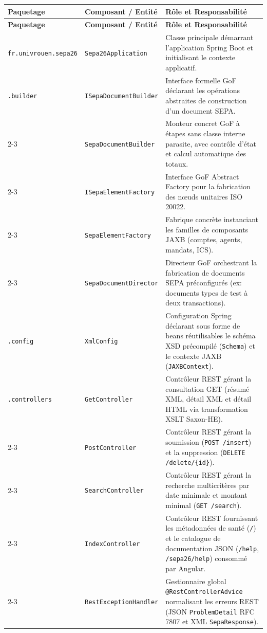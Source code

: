 \documentclass[12pt,a4paper]{article}
\begin{document}
\small
\begin{longtable}{|p{3.8cm}|p{4.6cm}|p{6.8cm}|}
    \hline
    \textbf{Paquetage} & \textbf{Composant / Entité} & \textbf{Rôle et Responsabilité} \\
    \hline
    \endfirsthead
    \hline
    \textbf{Paquetage} & \textbf{Composant / Entité} & \textbf{Rôle et Responsabilité} \\
    \hline
    \endhead

    \texttt{fr.univrouen.sepa26} & \texttt{Sepa26Application} & Classe principale démarrant l'application Spring Boot et initialisant le contexte applicatif. \\
    \hline

    \texttt{.builder} & \texttt{ISepaDocumentBuilder} & Interface formelle GoF déclarant les opérations abstraites de construction d'un document SEPA. \\
    \cline{2-3}
    & \texttt{SepaDocumentBuilder} & Monteur concret GoF à étapes sans classe interne parasite, avec contrôle d'état et calcul automatique des totaux. \\
    \cline{2-3}
    & \texttt{ISepaElementFactory} & Interface GoF Abstract Factory pour la fabrication des nœuds unitaires ISO 20022. \\
    \cline{2-3}
    & \texttt{SepaElementFactory} & Fabrique concrète instanciant les familles de composants JAXB (comptes, agents, mandats, ICS). \\
    \cline{2-3}
    & \texttt{SepaDocumentDirector} & Directeur GoF orchestrant la fabrication de documents SEPA préconfigurés (ex: documents types de test à deux transactions). \\
    \hline

    \texttt{.config} & \texttt{XmlConfig} & Configuration Spring déclarant sous forme de beans réutilisables le schéma XSD précompilé (\texttt{Schema}) et le contexte JAXB (\texttt{JAXBContext}). \\
    \hline

    \texttt{.controllers} & \texttt{GetController} & Contrôleur REST gérant la consultation GET (résumé XML, détail XML et détail HTML via transformation XSLT Saxon-HE). \\
    \cline{2-3}
    & \texttt{PostController} & Contrôleur REST gérant la soumission (\texttt{POST /insert}) et la suppression (\texttt{DELETE /delete/\{id\}}). \\
    \cline{2-3}
    & \texttt{SearchController} & Contrôleur REST gérant la recherche multicritères par date minimale et montant minimal (\texttt{GET /search}). \\
    \cline{2-3}
    & \texttt{IndexController} & Contrôleur REST fournissant les métadonnées de santé (\texttt{/}) et le catalogue de documentation JSON (\texttt{/help}, \texttt{/sepa26/help}) consommé par Angular. \\
    \cline{2-3}
    & \texttt{RestExceptionHandler} & Gestionnaire global \texttt{@RestControllerAdvice} normalisant les erreurs REST (JSON \texttt{ProblemDetail} RFC 7807 et XML \texttt{SepaResponse}). \\
    \hline


\end{longtable}
\end{document}

